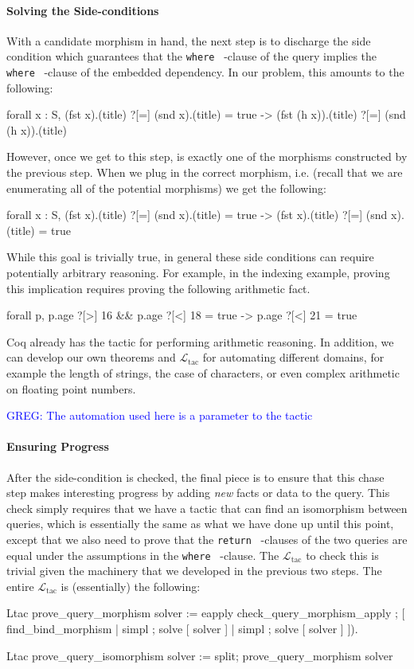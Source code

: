 \documentclass[preprint]{sigplanconf}
\newcommand{\WHERE}{{\tt where} \ }
\newcommand{\RETURN}{{\tt return} \ }
\newcommand{\greg}[1]{\textcolor{blue}{GREG: #1}}
\newcommand{\ltac}[0]{\ensuremath{\mathcal{L}_{\mathrm{tac}}}}
\begin{document}
\paragraph{Solving the Side-conditions}
With a candidate morphism in hand, the next step is to discharge the side condition which guarantees that the \WHERE-clause of the query implies the \WHERE-clause of the embedded dependency.
In our problem, this amounts to the following:
\begin{coq}
forall x : S, (fst x).(title) ?[=] (snd x).(title) = true
     -> (fst (h x)).(title) ?[=] (snd (h x)).(title)
\end{coq}
However, once we get to this step,  is exactly one of the morphisms constructed by the previous step.
When we plug in the correct morphism, i.e.  (recall that we are enumerating all of the potential morphisms) we get the following:
\begin{coq}
forall x : S, (fst x).(title) ?[=] (snd x).(title) = true
     -> (fst x).(title) ?[=] (snd x).(title) = true
\end{coq}
While this goal is trivially true, in general these side conditions can require potentially arbitrary reasoning.
For example, in the indexing example, proving this implication requires proving the following arithmetic fact.
\begin{coq}
forall p, p.age ?[>] 16 && p.age ?[<] 18 = true ->
          p.age ?[<] 21 = true
\end{coq}
Coq already has the  tactic for performing arithmetic reasoning.
In addition, we can develop our own theorems and \ltac{} for automating different domains, for example the length of strings, the case of characters, or even complex arithmetic on floating point numbers.

\greg{The automation used here is a parameter to the tactic}

\paragraph{Ensuring Progress}
After the side-condition is checked, the final piece is to ensure that this chase step makes interesting progress by adding \emph{new} facts or data to the query.
This check simply requires that we have a tactic that can find an isomorphism between queries, which is essentially the same as what we have done up until this point, except that we also need to prove that the \RETURN-clauses of the two queries are equal under the assumptions in the \WHERE-clause.
The \ltac{} to check this is trivial given the machinery that we developed in the previous two steps.
The entire \ltac{} is (essentially) the following:
\begin{coq}
Ltac prove_query_morphism solver :=
  eapply check_query_morphism_apply ;
    [ find_bind_morphism
    | simpl ; solve [ solver ]
    | simpl ; solve [ solver ] ]).

Ltac prove_query_isomorphism solver :=
  split; prove_query_morphism solver
\end{coq}
\end{document}
